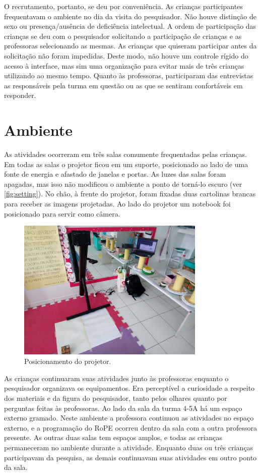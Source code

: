 O recrutamento, portanto, se deu por conveniência. As crianças participantes frequentavam o ambiente no dia da visita do pesquisador. Não houve distinção de sexo ou presença/ausência de deficiência intelectual. A ordem de participação das crianças se deu com o pesquisador solicitando a participação de crianças e as professoras selecionando as mesmas. As crianças que quiseram participar antes da solicitação não foram impedidas. Deste modo, não houve um controle rígido do acesso à interface, mas sim uma organização para evitar mais de três crianças utilizando ao mesmo tempo. Quanto às professoras, participaram das entrevistas as responsáveis pela turma em questão ou as que se sentiram confortáveis em responder.

\section{Ambiente}
\label{sec:ambiente}
As atividades ocorreram em três salas comumente frequentadas pelas crianças. Em todas as salas o projetor ficou em um suporte, posicionado ao lado de uma fonte de energia e afastado de janelas e portas. As luzes das salas foram apagadas, mas isso não modificou o ambiente a ponto de torná-lo escuro (ver \autoref{fig:setting}). No chão, à frente do projetor, foram fixadas duas cartolinas brancas para receber as imagens projetadas. Ao lado do projetor um notebook foi posicionado para servir como câmera. 

\begin{figure}[!h]
    \centering
    \includegraphics[width=0.8\textwidth,fbox]{figs/setting_projector.jpg}
    \caption{Posicionamento do projetor.}
    \label{fig:setting}
\end{figure}

As crianças continuaram suas atividades junto às professoras enquanto o pesquisador organizava os equipamentos. Era perceptível a curiosidade a respeito dos materiais e da figura do pesquisador, tanto pelos olhares quanto por perguntas feitas às professoras. Ao lado da sala da turma 4-5A há um espaço externo gramado. Neste ambiente a professora continuou as atividades no espaço externo, e a programação do RoPE ocorreu dentro da sala com a outra professora presente. As outras duas salas tem espaços amplos, e todas as crianças permaneceram no ambiente durante a atividade. Enquanto duas ou três crianças participavam da pesquisa, as demais continuavam suas atividades em outro ponto da sala.
 
